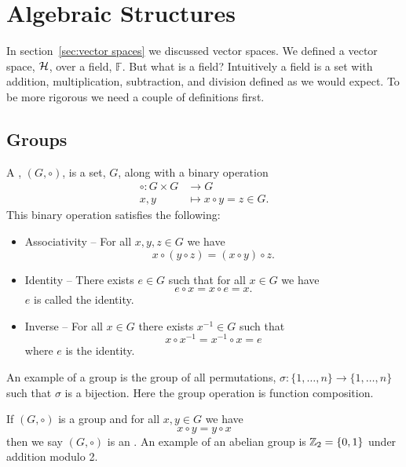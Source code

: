 \section{Algebraic Structures}
    In section~\ref{sec:vector spaces} we discussed vector spaces.
    We defined a vector space, \(\mathcal{H}\), over a field, \(\mathbb{F}\).
    But what is a field?
    Intuitively a field is a set with addition, multiplication, subtraction, and division defined as we would expect.
    To be more rigorous we need a couple of definitions first.
    
    \subsection{Groups}
    A , \((G, \circ)\), is a set, \(G\), along with a binary operation 
    \begin{align*}
        \circ\colon G\times G &\to G\\
        x, y &\mapsto x\circ y = z\in G.
    \end{align*}
    This binary operation satisfies the following:
    \begin{itemize}
        \item Associativity -- For all \(x, y, z\in G\) we have
        \[x \circ (y \circ z) = (x \circ y) \circ z.\]
        \item Identity -- There exists \(e\in G\) such that for all \(x\in G\) we have
        \[e \circ x = x \circ e = x.\]
        \(e\) is called the identity.
        \item Inverse -- For all \(x\in G\) there exists \(x^{-1}\in G\) such that
        \[x \circ x^{-1} = x^{-1} \circ x = e\]
        where \(e\) is the identity.
    \end{itemize}
    An example of a group is the group of all permutations, \(\sigma\colon \{1, \dotsc, n\} \to \{1, \dotsc, n\}\) such that \(\sigma\) is a bijection.
    Here the group operation is function composition.
    
    If \((G, \circ)\) is a group and for all \(x, y\in G\) we have
    \[x\circ y = y\circ x\]
    then we say \((G, \circ)\) is an .
    An example of an abelian group is \(\mathbb{Z}_2 = \{0, 1\}\) under addition modulo 2.
    
